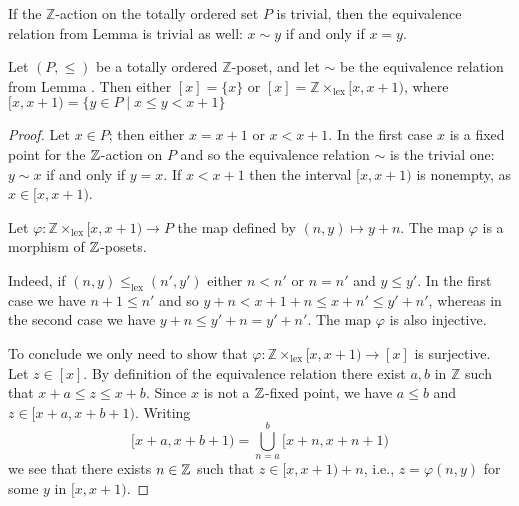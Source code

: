 \begin{remark}\label{iq=q}
If the $\mathbb{Z}$-action on the totally ordered set $P$ is trivial, then the equivalence relation from Lemma  is trivial as well: $x\sim y$ if and only if $x=y$.
\end{remark}
\begin{lemma}\label{lemma.representatives}
Let $(P, \leq)$ be a totally ordered $\mathbb{Z}$-poset, and let $\sim$ be the equivalence relation from Lemma . Then either $[x]=\{x\}$ or $[x]=\mathbb{Z}\times_{\mathrm{lex}}[x,x+1)$, where $[x,x+1)=\{y\in P\mid x\leq y<x+1\}$
\end{lemma}
\begin{proof}
Let $x\in P$; then either $x=x+1$ or $x<x+1$. In the first case $x$ is a fixed point for the $\mathbb{Z}$-action on $P$ and so the equivalence relation $\sim$ is the trivial one: $y\sim x$ if and only if $y=x$. If $x<x+1$ then the interval $[x,x+1)$ is nonempty, as $x\in [x,x+1)$.

Let $\varphi\colon \mathbb{Z}\times_{\mathrm{lex}}[x,x+1)\to P$ the map defined by $(n,y)\mapsto y+n$. The map $\varphi$ is a morphism of $\mathbb{Z}$-posets. 

Indeed, if $(n,y)\leq_{\mathrm{lex}} (n',y')$ either $n<n'$ or $n=n'$ and $y\leq y'$. In the first case we have $n+1\leq n'$ and so $y+n< x+1+n\leq x+n'\leq y'+n'$, whereas in the second case we have $y+n\leq y'+n=y'+n'$. The map $\varphi$ is also injective. %

To conclude we only need to show that $\varphi\colon  \mathbb{Z}\times_{\mathrm{lex}}[x,x+1)\to [x]$ is surjective. Let $z\in [x]$. By definition of the equivalence relation there exist $a,b$ in $\mathbb{Z}$ such that $x+a\leq z\leq x+b$. Since $x$ is not a $\mathbb{Z}$-fixed point, we have $a\leq b$ and $z\in [x+a,x+b+1)$. Writing
\[
[x+a,x+b+1)=\bigcup_{n=a}^{b}[x+n,x+n+1)
\]
we see that there exists $n\in \mathbb{Z}$ such that $z\in [x,x+1)+n$, i.e., $z=\varphi(n,y)$ for some $y$ in $[x,x+1)$.
\end{proof}
